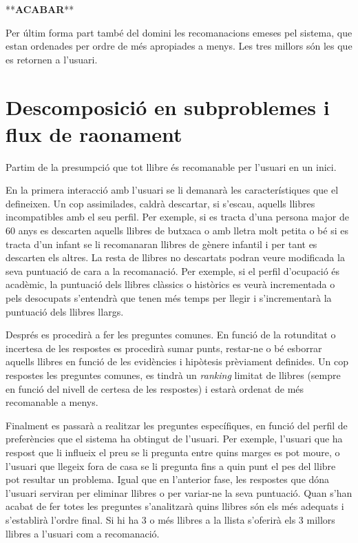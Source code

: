  **\textbf{ACABAR}**

Per últim forma part també del domini les recomanacions emeses pel sistema, que estan ordenades per ordre de més apropiades a menys. Les tres millors són les que es retornen a l'usuari.

\section{Descomposició en subproblemes i flux de raonament}

Partim de la presumpció que tot llibre és recomanable per l'usuari en un inici. 

En la primera interacció amb l'usuari se li demanarà les característiques que el defineixen. Un cop assimilades, caldrà descartar, si s'escau, aquells llibres incompatibles amb el seu perfil. Per exemple, si es tracta d'una persona major de 60 anys es descarten aquells llibres de butxaca o amb lletra molt petita o bé si es tracta d'un infant se li recomanaran llibres de gènere infantil i per tant es descarten els altres. La resta de llibres no descartats podran veure modificada la seva puntuació de cara a la recomanació. Per exemple, si el perfil d'ocupació és acadèmic, la puntuació dels llibres clàssics o històrics es veurà incrementada o pels desocupats s'entendrà que tenen més temps per llegir i s'incrementarà la puntuació dels llibres llargs. 

Després es procedirà a fer les preguntes comunes. En funció de la rotunditat o incertesa de les respostes es procedirà sumar punts, restar-ne o bé esborrar aquells llibres en funció de les evidències i hipòtesis prèviament definides. Un cop respostes les preguntes comunes, es tindrà un \emph{ranking} limitat de llibres (sempre en funció del nivell de certesa de les respostes) i estarà ordenat de més recomanable a menys.

Finalment es passarà a realitzar les preguntes específiques, en funció del perfil de preferències que el sistema ha obtingut de l'usuari. Per exemple, l'usuari que ha respost que li influeix el preu se li pregunta entre quins marges es pot moure, o l'usuari que llegeix fora de casa se li pregunta fins a quin punt el pes del llibre pot resultar un problema. Igual que en l'anterior fase, les respostes que dóna l'usuari serviran per eliminar llibres o per variar-ne la seva puntuació. Quan s'han acabat de fer totes les preguntes s'analitzarà quins llibres són els més adequats i s'establirà l'ordre final. Si hi ha 3 o més llibres a la llista s'oferirà els 3 millors llibres a l'usuari com a recomanació.


